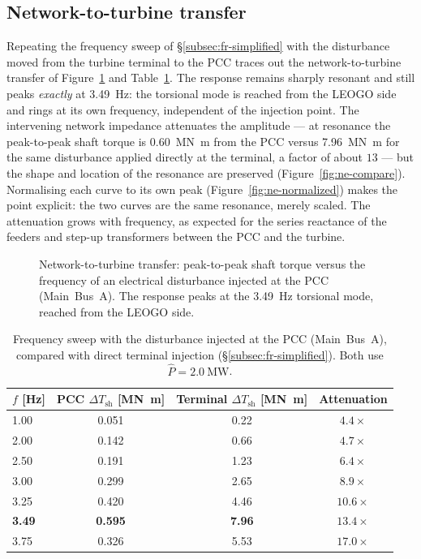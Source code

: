 \subsection{Network-to-turbine transfer}
\label{subsec:ne-transfer}

Repeating the frequency sweep of \S\ref{subsec:fr-simplified} with the
disturbance moved from the turbine terminal to the PCC traces out the
network-to-turbine transfer of Figure~\ref{fig:ne-curve} and
Table~\ref{tab:ne-sweep}. The response remains sharply resonant and still peaks
\emph{exactly} at \SI{3.49}{\hertz}: the torsional mode is reached from the
LEOGO side and rings at its own frequency, independent of the injection point.
The intervening network impedance attenuates the amplitude --- at resonance the
peak-to-peak shaft torque is \SI{0.60}{\mega\newton\metre} from the PCC versus
\SI{7.96}{\mega\newton\metre} for the same disturbance applied directly at the
terminal, a factor of about $13$ --- but the shape and location of the resonance
are preserved (Figure~\ref{fig:ne-compare}). Normalising each curve to its own
peak (Figure~\ref{fig:ne-normalized}) makes the point explicit: the two curves
are the same resonance, merely scaled. The attenuation grows with frequency, as
expected for the series reactance of the feeders and step-up transformers
between the PCC and the turbine.

\begin{figure}[t]
  \centering
  \caption{Network-to-turbine transfer: peak-to-peak shaft torque versus the
  frequency of an electrical disturbance injected at the PCC (Main~Bus~A). The
  response peaks at the \SI{3.49}{\hertz} torsional mode, reached from the LEOGO
  side.}
  \label{fig:ne-curve}
\end{figure}

\begin{table}[t]
  \centering
  \caption{Frequency sweep with the disturbance injected at the PCC
  (Main~Bus~A), compared with direct terminal injection
  (\S\ref{subsec:fr-simplified}). Both use $\hat{P}=\SI{2.0}{\mega\watt}$.}
  \label{tab:ne-sweep}
  \begin{tabular}{lccc}
    \toprule
    $f$ [\si{\hertz}] & PCC $\Delta T_{\mathrm{sh}}$
      [\si{\mega\newton\metre}] & Terminal $\Delta T_{\mathrm{sh}}$
      [\si{\mega\newton\metre}] & Attenuation \\
    \midrule
    1.00 & 0.051 & 0.22 & $4.4\times$ \\
    2.00 & 0.142 & 0.66 & $4.7\times$ \\
    2.50 & 0.191 & 1.23 & $6.4\times$ \\
    3.00 & 0.299 & 2.65 & $8.9\times$ \\
    3.25 & 0.420 & 4.46 & $10.6\times$ \\
    \textbf{3.49} & \textbf{0.595} & \textbf{7.96} & $\mathbf{13.4\times}$ \\
    3.75 & 0.326 & 5.53 & $17.0\times$ \\
    \bottomrule
  \end{tabular}
\end{table}

